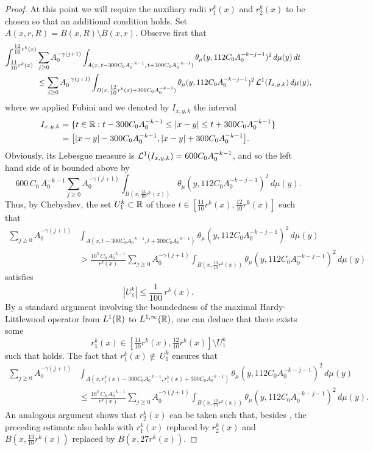 \begin{proof}
	At this point we will require the auxiliary radii $r_1^k(x)$ and $r_2^k(x)$ to be chosen so that an additional condition holds. Set $A(x,r,R) = B(x,R)\setminus B(x,r).$ 
Observe first that
\begin{align}\label{eqcalr45}
\int_{\tfrac{11}{10}r^k(x)}^{\tfrac{12}{10}r^k(x)}  &\sum_{j\geq0}  A_0^{-\gamma(j+1)} \int_{A(x,\,t-300C_0A_0^{-k-1},\,t+300C_0A_0^{-k-1})}
 \theta_\mu(y,112C_0A_0^{-k-j-1})^2\,d\mu(y)\,dt\\
& \leq\sum_{j\geq0}  A_0^{-\gamma(j+1)} \int_{B(x,\tfrac{12}{10}r^k(x)+300C_0A_0^{-k-1})}
 \theta_\mu(y,112C_0A_0^{-k-j-1})^2\,{\mathcal L}^1(I_{x,y,k})\,d\mu(y),\nonumber
\end{align} 
where we applied Fubini and we denoted by $I_{x,y,k}$ the interval
\begin{align*}
I_{x,y,k} & = \{t\in{\mathbb R}:t-300C_0A_0^{-k-1}\leq |x-y|\leq t+300C_0A_0^{-k-1}\}\\
&= \big[|x-y|-300C_0A_0^{-k-1},|x-y|+300C_0A_0^{-k-1}\big].
\end{align*}
Obviously, its Lebesgue measure is ${\mathcal L}^1(I_{x,y,k})= 600C_0A_0^{-k-1}$, and so the left hand side of 
is bounded above by
$$600 \,C_0\,A_0^{-k-1}\sum_{j\geq0} A_0^{-\gamma(j+1)} \!\! \int_{B(x,\tfrac{13}{10}r^k(x))}
 \theta_\mu(y,112C_0A_0^{-k-j-1})^2 \,d\mu(y).
$$  
	Thus, by Chebyshev, the set $U_{1}^k\subset{\mathbb R}$ of those $t\in [\tfrac{11}{10}r^k(x),\tfrac{12}{10}r^k(x)]$ such that
	\begin{align*}
		\sum_{j\geq0}  A_0^{-\gamma(j+1)} &\int_{A(x,t-300C_0A_0^{-k-1},t+300C_0A_0^{-k-1})}
		\theta_\mu(y,112C_0A_0^{-k-j-1})^2\,d\mu(y)\\
		&> \frac{10^5\,C_0\,A_0^{-k-1}}{r^k(x)}
		\sum_{j\geq0} A_0^{-\gamma(j+1)} 
		\int_{B(x,\tfrac{13}{10}r^k(x))}
		\theta_\mu(y,112C_0A_0^{-k-j-1})^2 \,d\mu(y)
	\end{align*}
	satisfies 
	$$|U_{1}^k|\leq \frac1{100}\,r^k(x).$$
	By a standard argument involving the  boundedness of the maximal Hardy-Littlewood operator 
	from $L^1({\mathbb R})$ to $L^{1,\infty}({\mathbb R})$, one can deduce that there exists some 
	$$r_1^k(x)\in [\tfrac{11}{10}r^k(x),\tfrac{12}{10}r^k(x)]\setminus
	U_{1}^k
	$$ 
	such that  holds. The fact that $r_1^k(x)\not\in\ U_{1}^k$
	ensures that
	\begin{align}\label{eqal848}
		\sum_{j\geq0}  A_0^{-\gamma(j+1)} &\int_{A(x,r_1^k(x)-300C_0A_0^{-k-1},r_1^k(x)+300C_0A_0^{-k-1})}
		\theta_\mu(y,112C_0A_0^{-k-j-1})^2\,d\mu(y)\\
		&\leq \frac{10^5\,C_0\,A_0^{-k-1}}{r^k(x)}
		\sum_{j\geq0} A_0^{-\gamma(j+1)} 
		\int_{B(x,\tfrac{13}{10}r^k(x))}
		\theta_\mu(y,112C_0A_0^{-k-j-1})^2 \,d\mu(y).
		\nonumber
	\end{align}
	An analogous argument shows that 
	$r^k_2(x)$ can be taken such that, besides , the 
	preceding estimate also holds with $r_1^k(x)$ replaced
	by $r_2^k(x)$ and $B(x,\tfrac{13}{10}r^k(x))$ replaced by $B(x,27r^k(x))$.
	

\end{proof}
